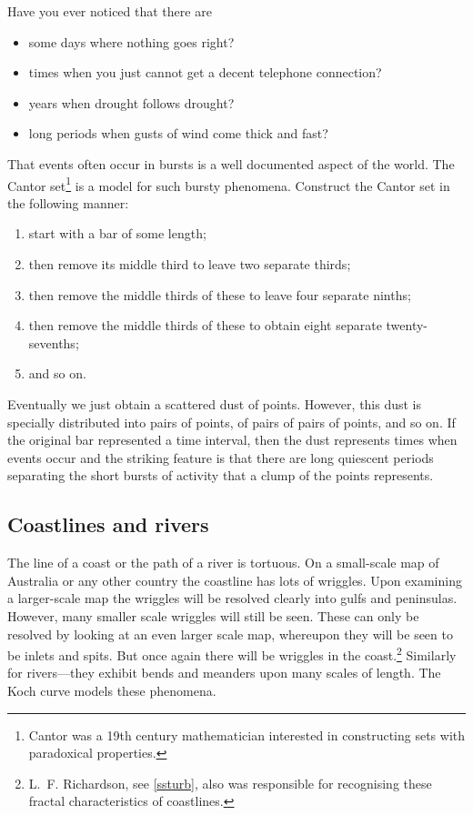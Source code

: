 \documentclass[12pt,a5paper]{article}
\begin{document}
Have you ever noticed that there are    
\begin{itemize}
	\item  some days where nothing goes right?

	\item  times when you just cannot get a decent telephone connection?

	\item  years when drought follows drought?

	\item  long periods when gusts of wind come thick and fast?
\end{itemize}
That events often occur in bursts 
is a well documented aspect of the world.  The Cantor 
set\footnote{Cantor was a 19th century mathematician interested in 
constructing sets with paradoxical properties.} is a model 
for such bursty phenomena.  Construct the Cantor set in the following 
manner:
\begin{enumerate}
	\item  start with a bar of some length; 

	\item  then remove its middle third to leave two separate thirds; 

	\item  then remove the middle thirds of these to leave four separate ninths; 

	\item  then remove the middle thirds of these to 
	obtain eight separate twenty-sevenths; 

	\item  and so on.  
\end{enumerate}
Eventually we just 
obtain a scattered dust of points.  However, this dust is specially 
distributed into pairs of points, of pairs of pairs of points, and so 
on.  If the original bar represented a time interval, then the dust 
represents times when events occur and the striking feature is that 
there are long quiescent periods separating the short bursts of 
activity that a clump of the points represents.

\subsection{Coastlines and rivers}
\label{sscoast}

The line of a coast or the path of a river is tortuous.  On a 
small-scale map of Australia or any other country the coastline has 
lots of wriggles.  Upon examining a larger-scale map the wriggles will 
be resolved clearly into gulfs and peninsulas.  However, many smaller 
scale wriggles will still be seen.  These can only be resolved by 
looking at an even larger scale map, whereupon they will be seen to be 
inlets and spits.  But once again there will be wriggles in the 
coast.\footnote{L.~F. Richardson, see \cref{ssturb}, also was 
responsible for recognising these fractal characteristics of 
coastlines.} Similarly for rivers---they exhibit bends and meanders 
upon many scales of length.  The Koch curve models these phenomena.
\end{document}

